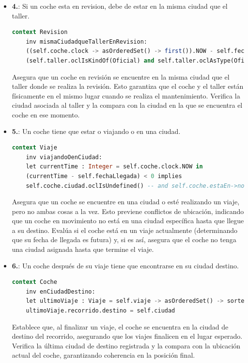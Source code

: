 \documentclass[12pt.a4paper]{article}
\begin{document}
\begin{itemize}
    \item \textbf{4.}: Si un coche esta en revision, debe de estar en la misma ciudad que el taller.
    \begin{lstlisting}[style = useEspecifico,language=SQL]
  context Revision
    inv mismaCiudadqueTallerEnRevision:
    ((self.coche.clock -> asOrderedSet() -> first()).NOW - self.fechaFin) < 0 implies
    (self.taller.oclIsKindOf(Oficial) and self.taller.oclAsType(Oficial).ciudad = self.coche.ciudad) or (self.taller.oclIsKindOf(No_Oficial) and self.taller.oclAsType(No_Oficial).ciudad = self.coche.ciudad)
    \end{lstlisting}
    Asegura que un coche en revisión se encuentre en la misma ciudad que el taller donde se realiza la revisión. Esto garantiza que el coche y el taller están físicamente en el mismo lugar cuando se realiza el mantenimiento.
    Verifica la ciudad asociada al taller y la compara con la ciudad en la que se encuentra el coche en ese momento.
    
    \item \textbf{5.}: Un coche tiene que estar o viajando o en una ciudad.
    \begin{lstlisting}[style = useEspecifico,language=SQL]
  context Viaje
    inv viajandoOenCiudad:
    let currentTime : Integer = self.coche.clock.NOW in
    (currentTime - self.fechaLlegada) < 0 implies
    self.coche.ciudad.oclIsUndefined() -- and self.coche.estaEn->notEmpty()
    \end{lstlisting}
    Asegura que un coche se encuentre en una ciudad o esté realizando un viaje, pero no ambas cosas a la vez. Esto previene conflictos de ubicación, indicando que un coche en movimiento no está en una ciudad específica hasta que llegue a su destino.
    Evalúa si el coche está en un viaje actualmente (determinando que su fecha de llegada es futura) y, si es así, asegura que el coche no tenga una ciudad asignada hasta que termine el viaje.
    
    \item \textbf{6.}: Un coche después de su viaje tiene que encontrarse en su ciudad destino.
    \begin{lstlisting}[style = useEspecifico,language=SQL]
  context Coche
    inv enCiudadDestino:
    let ultimoViaje : Viaje = self.viaje -> asOrderedSet() -> sortedBy(fechaLlegada) -> last() in
    ultimoViaje.recorrido.destino = self.ciudad
    \end{lstlisting}
    Establece que, al finalizar un viaje, el coche se encuentra en la ciudad de destino del recorrido, asegurando que los viajes finalicen en el lugar esperado.
    Verifica la última ciudad de destino registrada y la compara con la ubicación actual del coche, garantizando coherencia en la posición final.
    

\end{itemize}
\end{document}
